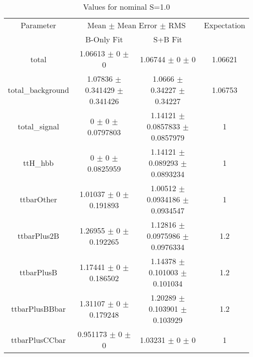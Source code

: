 \begin{table}
\centering
\caption{Values for nominal S=1.0}
\begin{tabular}{cccc}
\toprule
Parameter & \multicolumn{2}{c}{Mean $\pm$ Mean Error $\pm$ RMS} & Expectation\\
 & B-Only Fit & S+B Fit & \\
\midrule
total & \num{1.06613} $\pm$ \num{0} $\pm$ \num{0} & \num{1.06744} $\pm$ \num{0} $\pm$ \num{0} & \num{1.06621}\\
total\_background & \num{1.07836} $\pm$ \num{0.341429} $\pm$ \num{0.341426} & \num{1.0666} $\pm$ \num{0.34227} $\pm$ \num{0.34227} & \num{1.06753}\\
total\_signal & \num{0} $\pm$ \num{0} $\pm$ \num{0.0797803} & \num{1.14121} $\pm$ \num{0.0857833} $\pm$ \num{0.0857979} & \num{1}\\
ttH\_hbb & \num{0} $\pm$ \num{0} $\pm$ \num{0.0825959} & \num{1.14121} $\pm$ \num{0.089293} $\pm$ \num{0.0893234} & \num{1}\\
ttbarOther & \num{1.01037} $\pm$ \num{0} $\pm$ \num{0.191893} & \num{1.00512} $\pm$ \num{0.0934186} $\pm$ \num{0.0934547} & \num{1}\\
ttbarPlus2B & \num{1.26955} $\pm$ \num{0} $\pm$ \num{0.192265} & \num{1.12816} $\pm$ \num{0.0975986} $\pm$ \num{0.0976334} & \num{1.2}\\
ttbarPlusB & \num{1.17441} $\pm$ \num{0} $\pm$ \num{0.186502} & \num{1.14378} $\pm$ \num{0.101003} $\pm$ \num{0.101034} & \num{1.2}\\
ttbarPlusBBbar & \num{1.31107} $\pm$ \num{0} $\pm$ \num{0.179248} & \num{1.20289} $\pm$ \num{0.103901} $\pm$ \num{0.103929} & \num{1.2}\\
ttbarPlusCCbar & \num{0.951173} $\pm$ \num{0} $\pm$ \num{0} & \num{1.03231} $\pm$ \num{0} $\pm$ \num{0} & \num{1}\\
\bottomrule
\end{tabular}
\end{table}